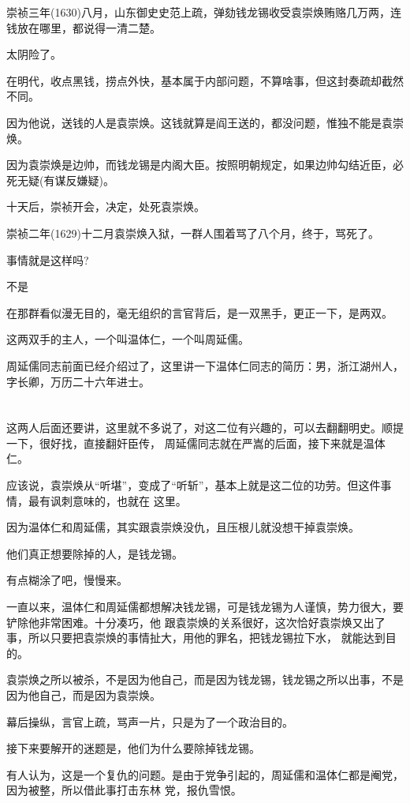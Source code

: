 \documentclass[11pt,a4paper,onecolumn]{article}
\begin{document}
崇祯三年(1630)八月，山东御史史范上疏，弹劾钱龙锡收受袁崇焕贿赂几万两，连钱放在哪里，都说得一清二楚。

太阴险了。

在明代，收点黑钱，捞点外快，基本属于内部问题，不算啥事，但这封奏疏却截然不同。

因为他说，送钱的人是袁崇焕。这钱就算是阎王送的，都没问题，惟独不能是袁崇焕。

因为袁崇焕是边帅，而钱龙锡是内阁大臣。按照明朝规定，如果边帅勾结近臣，必死无疑(有谋反嫌疑)。

十天后，崇祯开会，决定，处死袁崇焕。

崇祯二年(1629)十二月袁崇焕入狱，一群人围着骂了八个月，终于，骂死了。

事情就是这样吗?

不是

在那群看似漫无目的，毫无组织的言官背后，是一双黑手，更正一下，是两双。

这两双手的主人，一个叫温体仁，一个叫周延儒。

周延儒同志前面已经介绍过了，这里讲一下温体仁同志的简历：男，浙江湖州人，字长卿，万历二十六年进士。

\section[\thesection]{}

这两人后面还要讲，这里就不多说了，对这二位有兴趣的，可以去翻翻明史。顺提一下，很好找，直接翻奸臣传，
周延儒同志就在严嵩的后面，接下来就是温体仁。

应该说，袁崇焕从``听堪''，变成了``听斩''，基本上就是这二位的功劳。但这件事情，最有讽刺意味的，也就在
这里。

因为温体仁和周延儒，其实跟袁崇焕没仇，且压根儿就没想干掉袁崇焕。

他们真正想要除掉的人，是钱龙锡。

有点糊涂了吧，慢慢来。

一直以来，温体仁和周延儒都想解决钱龙锡，可是钱龙锡为人谨慎，势力很大，要铲除他非常困难。十分凑巧，他
跟袁崇焕的关系很好，这次恰好袁崇焕又出了事，所以只要把袁崇焕的事情扯大，用他的罪名，把钱龙锡拉下水，
就能达到目的。

袁崇焕之所以被杀，不是因为他自己，而是因为钱龙锡，钱龙锡之所以出事，不是因为他自己，而是因为袁崇焕。

幕后操纵，言官上疏，骂声一片，只是为了一个政治目的。

接下来要解开的迷题是，他们为什么要除掉钱龙锡。

有人认为，这是一个复仇的问题。是由于党争引起的，周延儒和温体仁都是阉党，因为被整，所以借此事打击东林
党，报仇雪恨。
\end{document}
